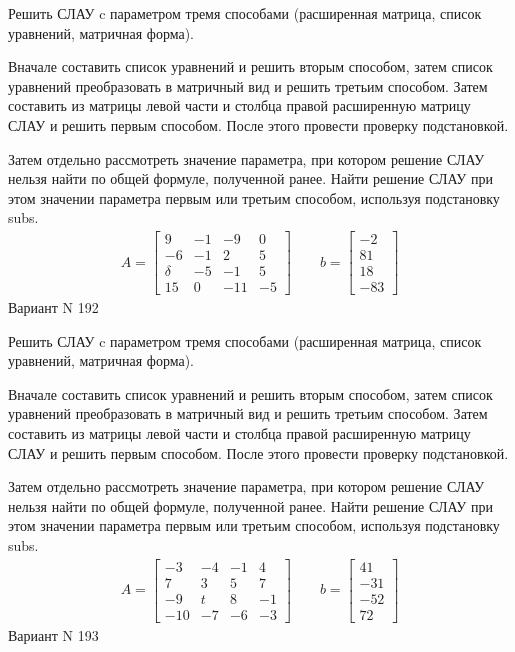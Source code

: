 \documentclass[11pt]{report}
\begin{document}
Решить СЛАУ c параметром тремя способами (расширенная матрица, список уравнений, матричная форма).

Вначале составить список уравнений и решить вторым способом,
затем список уравнений преобразовать в матричный вид и решить третьим способом.
Затем составить из матрицы левой части и столбца правой расширенную матрицу СЛАУ и решить первым способом.
После этого провести проверку подстановкой.

Затем отдельно рассмотреть значение параметра, при котором решение СЛАУ нельзя найти по общей формуле,
полученной ранее.
Найти решение СЛАУ при этом значении параметра первым или третьим способом, используя подстановку subs.
\begin{align*}
    A = \left[\begin{matrix}9 & -1 & -9 & 0\\-6 & -1 & 2 & 5\\\delta & -5 & -1 & 5\\15 & 0 & -11 & -5\end{matrix}\right]
\qquad b = \left[\begin{matrix}-2\\81\\18\\-83\end{matrix}\right]
\end{align*}
\newpage
Вариант N 192


Решить СЛАУ c параметром тремя способами (расширенная матрица, список уравнений, матричная форма).

Вначале составить список уравнений и решить вторым способом,
затем список уравнений преобразовать в матричный вид и решить третьим способом.
Затем составить из матрицы левой части и столбца правой расширенную матрицу СЛАУ и решить первым способом.
После этого провести проверку подстановкой.

Затем отдельно рассмотреть значение параметра, при котором решение СЛАУ нельзя найти по общей формуле,
полученной ранее.
Найти решение СЛАУ при этом значении параметра первым или третьим способом, используя подстановку subs.
\begin{align*}
    A = \left[\begin{matrix}-3 & -4 & -1 & 4\\7 & 3 & 5 & 7\\-9 & t & 8 & -1\\-10 & -7 & -6 & -3\end{matrix}\right]
\qquad b = \left[\begin{matrix}41\\-31\\-52\\72\end{matrix}\right]
\end{align*}
\newpage
Вариант N 193
\end{document}
